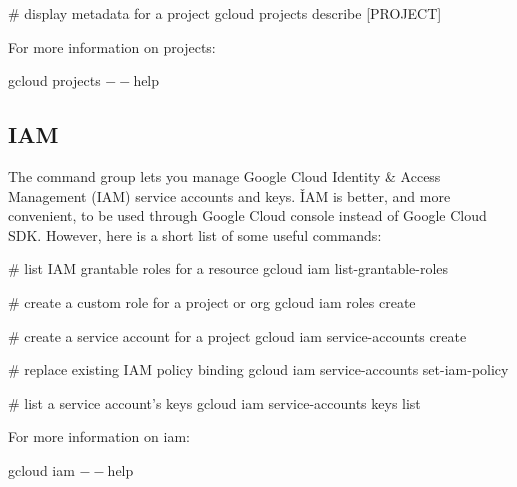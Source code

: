 \begin{bash}
# display metadata for a project
gcloud projects describe [PROJECT]
\end{bash}

For more information on projects:
\begin{bash}
gcloud projects $--$help
\end{bash}

\subsection{IAM}

The  command group lets you manage Google Cloud Identity \& Access Management (IAM) service accounts
and keys. \v

IAM is better, and more convenient, to be used through Google Cloud console instead of Google Cloud SDK. However, here
is a short list of some useful commands:
\begin{bash}
# list IAM grantable roles for a resource
gcloud iam list-grantable-roles
\end{bash}

\begin{bash}
# create a custom role for a project or org
gcloud iam roles create
\end{bash}

\begin{bash}
# create a service account for a project
gcloud iam service-accounts create
\end{bash}

\begin{bash}
# replace existing IAM policy binding
gcloud iam service-accounts set-iam-policy
\end{bash}

\begin{bash}
# list a service account's keys
gcloud iam service-accounts keys list
\end{bash}

For more information on iam:
\begin{bash}
gcloud iam $--$help
\end{bash}